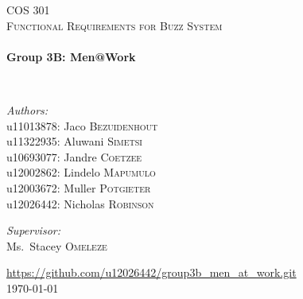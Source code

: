 
\begin{titlepage}
\begin{center}


\textsc{\LARGE COS 301}\\[1.5cm]

\textsc{\large Functional Requirements for Buzz System}\\[0.5cm]

\HRule \\[0.4cm]
{ \huge \bfseries Group 3B: Men@Work \\[0.4cm] }

\HRule \\[1.5cm]

\noindent
\begin{minipage}{0.4\textwidth}
\begin{flushleft} \large
\emph{Authors:}\\
u11013878: Jaco \textsc{Bezuidenhout}\\
u11322935: Aluwani \textsc{Simetsi}\\
u10693077: Jandre \textsc{Coetzee}\\
u12002862: Lindelo \textsc{Mapumulo}\\
u12003672: Muller \textsc{Potgieter}\\
u12026442: Nicholas \textsc{Robinson}
\end{flushleft}
\end{minipage}
\begin{minipage}{0.4\textwidth}
\begin{flushright} \large
\emph{Supervisor:} \\
Ms.~Stacey \textsc{Omeleze}
\end{flushright}
\end{minipage}





\vfill

\url{ https://github.com/u12026442/group3b_men_at_work.git}\\
{\large \today}

\end{center}
\end{titlepage}
